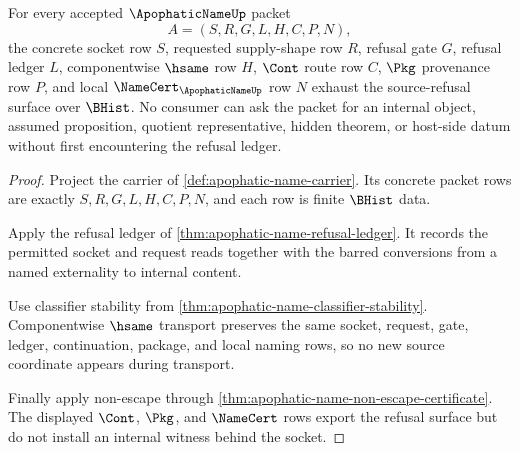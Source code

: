 \begin{theorem}
\label{thm:apophatic-name-source-refusal-totality}
For every accepted $\ApophaticNameUp$ packet
$$
A=(S,R,G,L,H,C,P,N),
$$
the concrete socket row $S$, requested supply-shape row $R$, refusal gate $G$, refusal ledger $L$, componentwise $\hsame$ row $H$, $\Cont$ route row $C$, $\Pkg$ provenance row $P$, and local $\NameCert_{\ApophaticNameUp}$ row $N$ exhaust the source-refusal surface over $\BHist$. No consumer can ask the packet for an internal object, assumed proposition, quotient representative, hidden theorem, or host-side datum without first encountering the refusal ledger.
\end{theorem}
\begin{proof}
Project the carrier of \autoref{def:apophatic-name-carrier}. Its concrete packet rows are exactly $S,R,G,L,H,C,P,N$, and each row is finite $\BHist$ data.

Apply the refusal ledger of \autoref{thm:apophatic-name-refusal-ledger}. It records the permitted socket and request reads together with the barred conversions from a named externality to internal content.

Use classifier stability from \autoref{thm:apophatic-name-classifier-stability}. Componentwise $\hsame$ transport preserves the same socket, request, gate, ledger, continuation, package, and local naming rows, so no new source coordinate appears during transport.

Finally apply non-escape through \autoref{thm:apophatic-name-non-escape-certificate}. The displayed $\Cont$, $\Pkg$, and $\NameCert$ rows export the refusal surface but do not install an internal witness behind the socket.
\end{proof}

